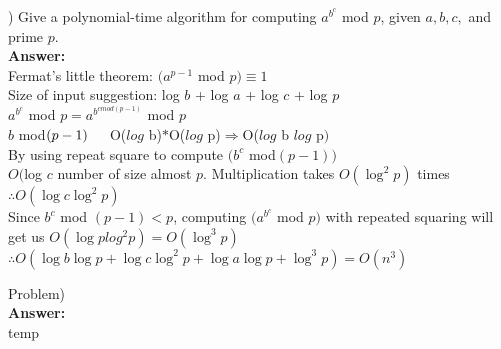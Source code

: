 \documentclass{article}
\begin{document}
\vspace{.3in}
) Give a polynomial-time algorithm for computing $a^{b^c}$ mod $p$, given $a, b, c,$ 
\indent and prime $p$. \\
\vspace{.1in}
{\bf Answer:} \\
\indent Fermat's little theorem: $(a^{p-1}$ mod $p) \equiv 1$ \\
\indent Size of input suggestion: log $b$ + log $a$ + log $c$ + log $p$ \\

\indent $a^{b^c}$ mod $p = a^{b^{c mod(p - 1)}}$ mod $p$ \\
\indent $b$ mod$(p - 1) \\ 
\indent $O($log$ b)$ * $O($log$ p)$ \Rightarrow $O($log$ b $ log$ p$)$ \\

\indent By using repeat square to compute $(b^c$ mod$(p - 1))$ \\
\indent $O($log $ c$ number of size almost $p$. Multiplication takes $O(\log^2 p)$ times \\

\indent $\therefore O(\log c \log^2 p)$ \\

\indent Since $b^c$ mod $(p - 1) < p$, computing $(a^{b^c}$ mod $p)$ with repeated squaring will get us $O(\log p log^2 p) = O(\log^3 p)$ \\

\indent $\therefore O(\log b \log p + \log c \log^2 p + \log a\log p + \log^3 p) = O(n^3)$

\vspace{.3in}
\noindent Problem) \\
\vspace{.1in}
{\bf Answer:} \\
\indent temp
\end{document}

